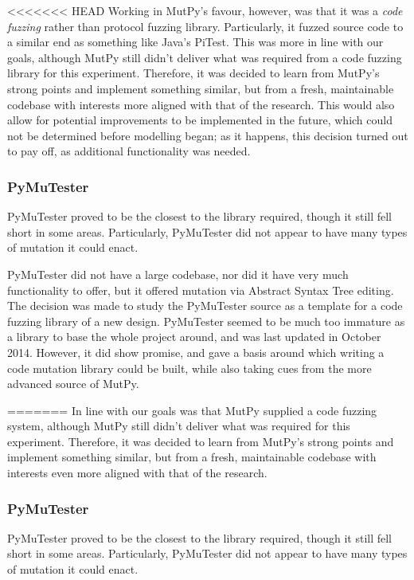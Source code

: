 \documentclass{sig-alternate}
\begin{document}
<<<<<<< HEAD
Working in MutPy's favour, however, was that it was a \emph{code fuzzing} rather than protocol fuzzing library. Particularly, it fuzzed source code to a similar end as something like Java's PiTest\cite{coles14pitest}. This was more in line with our goals, although MutPy still didn't deliver what was required from a code fuzzing library for this experiment. Therefore, it was decided to learn from MutPy's strong points and implement something similar, but from a fresh, maintainable codebase with interests more aligned with that of the research. This would also allow for potential improvements to be implemented in the future, which could not be determined before modelling began; as it happens, this decision turned out to pay off, as additional functionality was needed. \par

\subsubsection{PyMuTester}
\label{fuzzing_pymutester}
PyMuTester\cite{PyMutTester} proved to be the closest to the library required, though it still fell short in some areas. Particularly, PyMuTester did not appear to have many types of mutation it could enact. \par
PyMuTester did not have a large codebase\cite{PyMutTester}, nor did it have very much functionality to offer, but it offered mutation via Abstract Syntax Tree editing. The decision was made to study the PyMuTester source as a template for a code fuzzing library of a new design. PyMuTester seemed to be much too immature as a library to base the whole project around, and was last updated in October 2014. However, it did show promise, and gave a basis around which writing a code mutation library could be built, while also taking cues from the more advanced source of MutPy\cite{khala8:online}.  \par%
=======
In line with our goals was that MutPy supplied a code fuzzing system, although MutPy still didn't deliver what was required for this experiment. Therefore, it was decided to learn from MutPy's strong points and implement something similar, but from a fresh, maintainable codebase with interests even more aligned with that of the research. \par

\subsubsection{PyMuTester}
\label{fuzzing_pymutester}
PyMuTester\cite{GitHu12:online} proved to be the closest to the library required, though it still fell short in some areas. Particularly, PyMuTester did not appear to have many types of mutation it could enact. \par
\end{document}
